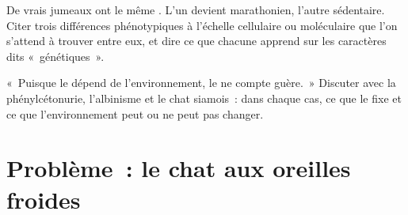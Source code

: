 \begin{exercise}[$\star\star\star$]\label{exo:g11:enzymes-and-phenotype:14}
De vrais jumeaux ont le même . L'un devient marathonien,
l'autre sédentaire. Citer trois différences phénotypiques à l'échelle
cellulaire ou moléculaire que l'on s'attend à trouver entre eux, et
dire ce que chacune apprend sur les caractères dits «~génétiques~».
\end{exercise}

\begin{exercise}[$\star\star\star$]\label{exo:g11:enzymes-and-phenotype:15}
«~Puisque le  dépend de l'environnement, le  ne compte
guère.~» Discuter avec la phénylcétonurie, l'albinisme et le chat
siamois~: dans chaque cas, ce que le  fixe et ce que
l'environnement peut ou ne peut pas changer.
\end{exercise}

\section{Problème~: le chat aux oreilles froides}

